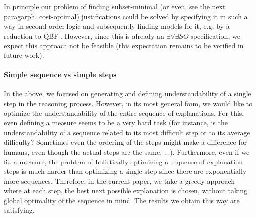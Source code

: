In principle our problem of finding subset-minimal (or even, see the next paragarph, cost-optimal) justifications could be solved by specifying it in such a way in second-order logic and subsequently finding models for it, e.g. by a reduction to QBF \cite{kr/BogaertsTS16,kr/vanderHallenJ18}. 
However, since this is already an $\exists\forall\exists SO$ specification, we expect this approach not be feasible (this expectation remains to be verified in future work). 

\paragraph{Simple sequence vs simple steps}
In the above, we focused on generating and defining understandability of a single step in the reasoning process. 
However, in its most general form, we would like to optimize the understandability of the entire sequence of explanations. 
For this, even defining a measure seems to be a very hard task (for instance, is the understandability of a sequence related to its most difficult step or to its average difficulty? Sometimes even the ordering of the steps might make a difference for humans, even though the actual steps are the same, ...). 
Furthermore, even if we fix a measure, the problem of holistically optimizing a sequence of explanation steps is much harder than optimizing a single step since there are exponentially more sequences. 
Therefore, in the current paper, we take a greedy approach where at each step, the best next possible explanation is chosen, without taking global optimality of the sequence in mind. The results we obtain this way are satisfying. 



